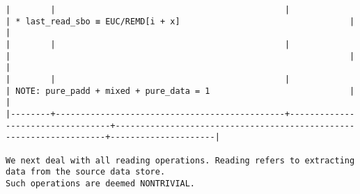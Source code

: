 \documentclass[varwidth=\maxdimen,margin=0.5cm,multi={verbatim}]{standalone}
\begin{document}
\begin{verbatim}
|        |                                              |                                  | * last_read_sbo ≡ EUC/REMD[i + x]                                  |                     |
|        |                                              |                                  |                                                                    |                     |
|        |                                              |                                  | NOTE: pure_padd + mixed + pure_data = 1                            |                     |
|--------+----------------------------------------------+----------------------------------+--------------------------------------------------------------------+---------------------|

We next deal with all reading operations. Reading refers to extracting data from the source data store.
Such operations are deemed NONTRIVIAL.


\end{verbatim}
\end{document}
